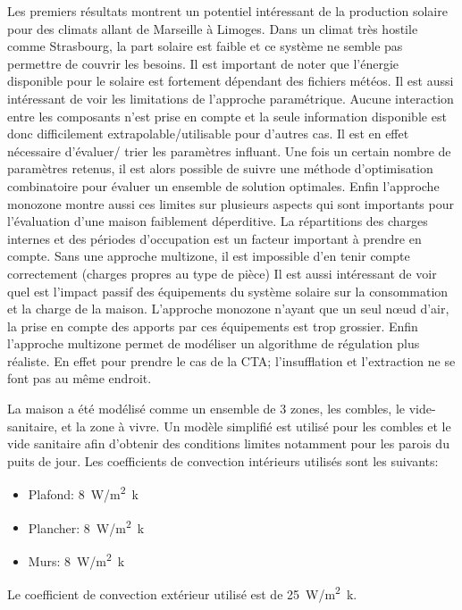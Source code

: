 Les premiers résultats montrent un potentiel intéressant de la production solaire pour
des climats allant de Marseille à Limoges. Dans un climat très hostile comme
Strasbourg, la part solaire est faible et ce système ne semble pas permettre de couvrir
les besoins. Il est important de noter que l’énergie disponible pour le solaire est
fortement dépendant des fichiers météos.
Il est aussi intéressant de voir les limitations de l’approche paramétrique. Aucune
interaction entre les composants n’est prise en compte et la seule information disponible
est donc difficilement extrapolable/utilisable pour d’autres cas. Il est en effet nécessaire
d’évaluer/ trier les paramètres influant. Une fois un certain nombre de paramètres retenus,
il est alors possible de suivre une méthode d’optimisation combinatoire pour évaluer
un ensemble de solution optimales.
Enfin l’approche monozone montre aussi ces limites sur plusieurs aspects qui sont importants
pour l’évaluation d’une maison faiblement déperditive. La répartitions des charges internes
et des périodes d’occupation est un facteur important à prendre en compte. Sans une approche
multizone, il est impossible d’en tenir compte correctement (charges propres au type de pièce)
Il est aussi intéressant de voir quel est l’impact passif des équipements du système solaire sur la
consommation et la charge de la maison. L’approche monozone n’ayant que un seul nœud
d’air, la prise en compte des apports par ces équipements est trop grossier.
Enfin l’approche multizone permet de modéliser un algorithme de régulation plus réaliste.
En effet pour prendre le cas de la CTA; l’insufflation et l’extraction ne se font pas au même endroit.

La maison a été modélisé comme un ensemble de 3 zones, les combles, le vide-sanitaire, et la zone
à vivre. Un modèle simplifié est utilisé pour les combles et le vide sanitaire
afin d’obtenir des conditions limites notamment pour les parois du puits de jour.
Les coefficients de convection intérieurs utilisés sont les suivants:
\begin{itemize}
    \item Plafond: 8~\si{W/m^{2}.k}
    \item Plancher: 8~\si{W/m^{2}.k}
    \item Murs: 8~\si{W/m^{2}.k}
\end{itemize}

Le coefficient de convection extérieur utilisé est de 25~\si{W/m^{2}.k}.


